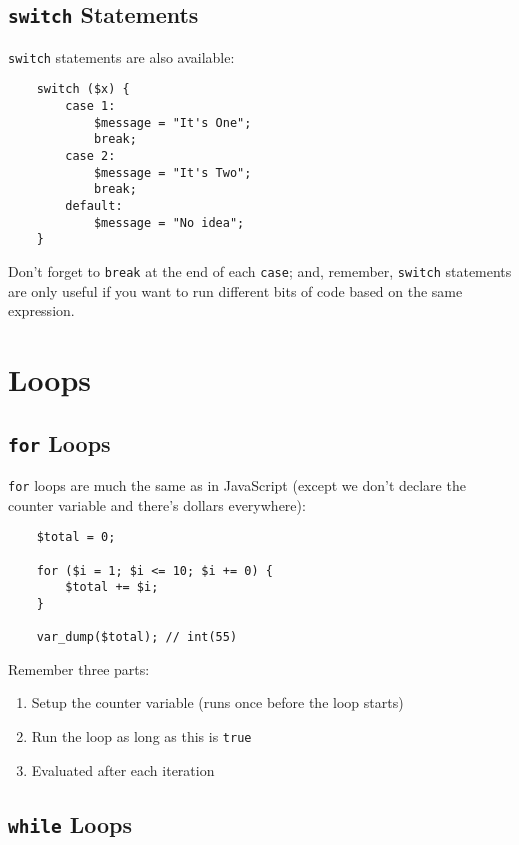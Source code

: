 \subsection{\texttt{switch} Statements}

\texttt{switch} statements are also available:

\begin{verbatim}
    switch ($x) {
        case 1:
            $message = "It's One";
            break;
        case 2:
            $message = "It's Two";
            break;
        default:
            $message = "No idea";
    }
\end{verbatim}

Don't forget to \texttt{break} at the end of each \texttt{case}; and, remember, \texttt{switch} statements are only useful if you want to run different bits of code based on the same expression.


\section{Loops}

\subsection{\texttt{for} Loops}

\texttt{for} loops are much the same as in JavaScript (except we don't declare the counter variable and there's dollars everywhere):

\begin{verbatim}
    $total = 0;

    for ($i = 1; $i <= 10; $i += 0) {
        $total += $i;
    }

    var_dump($total); // int(55)
\end{verbatim}

Remember three parts:

\begin{enumerate}
    \item Setup the counter variable (runs once before the loop starts)
    \item Run the loop as long as this is \texttt{true}
    \item Evaluated after each iteration
\end{enumerate}

\subsection{\texttt{while} Loops}

